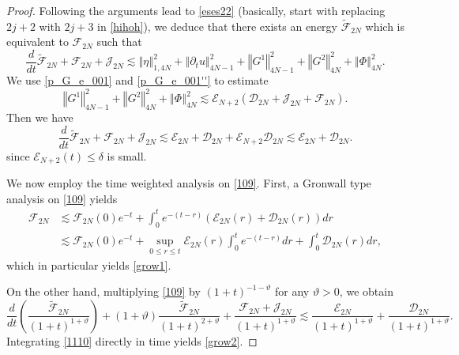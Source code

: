 \documentclass[a4paper,reqno,11pt]{amsart}
\numberwithin{equation}{section}
\providecommand{\norm}[1]{\left\Vert#1\right\Vert}
\providecommand{\sd}[1]{\mathcal{D}_{#1}}
\providecommand{\se}[1]{\mathcal{E}_{#1}}
\providecommand{\norm}[1]{\left\Vert#1\right\Vert}
\begin{document}
\begin{proof}
Following the arguments lead to \eqref{eses22} (basically, start with replacing $2j+2$ with $2j+3$ in \eqref{hihoh}), we deduce that there exists an energy $\tilde{\mathcal{F}}_{2N}$ which is equivalent to ${\mathcal{F}_{2N}}$ such that
\begin{equation}
 { \frac{d}{dt}}\tilde{\mathcal{F}}_{2N}
+  {\mathcal{F}_{2N}} +\mathcal{J}_{2N}  {\lesssim}  \norm{\eta}_{1,4N}^2+ \norm{{\partial}_t u}_{4N-1}^2
 + \norm{G^1}_{4N-1}^2+\norm{G^2}_{4N}^2+\norm{\Phi}_{4N}^2.
\end{equation}
We use \eqref{p_G_e_001} and \eqref{p_G_e_001''} to estimate
\begin{equation}
\norm{G^1}_{4N-1}^2+\norm{G^2}_{4N}^2+\norm{\Phi}_{4N}^2\lesssim  { \se{N+2}  }(\sd{2N} +  \mathcal{J}_{2N} +{\mathcal{F}_{2N}}).
\end{equation}
Then we have
\begin{equation}\label{109}
 { \frac{d}{dt}}\tilde{\mathcal{F}}_{2N}
+  {\mathcal{F}_{2N}} +\mathcal{J}_{2N}  {\lesssim}  \se{2N}+ \sd{2N}
 + { \se{N+2}  } \sd{2N}{\lesssim}  \se{2N}+ \sd{2N}.
\end{equation}
since $\se{N+2}(t) \le \delta$ is small.

We now employ the time weighted analysis on \eqref{109}. First, a Gronwall type analysis on \eqref{109} yields
\begin{equation}\label{1001}
\begin{split}
  {\mathcal{F}_{2N}}  & {\lesssim}  {\mathcal{F}_{2N}}(0) e^{-t}+\int_0^t e^{-(t-r)}\left(  \se{2N}(r)+ \sd{2N}(r) \right)dr
  \\& {\lesssim} {\mathcal{F}_{2N}}(0) e^{-t}+\sup_{0\le r\le t}\mathcal{E}_{2N}(r) \int_0^t e^{-(t-r)}dr+  \int_0^t \sd{2N}(r)  dr,
  \end{split}
\end{equation}
which in particular yields \eqref{grow1}.

On the other hand, multiplying \eqref{109} by $(1+t)^{-1-\vartheta}$ for any $\vartheta>0$, we obtain
\begin{equation}\label{1110}
 { \frac{d}{dt}} \left( \frac{\tilde{\mathcal{F}}_{2N}}{(1+t)^{1+\vartheta}}\right)+(1+\vartheta)\frac{\tilde{\mathcal{F}}_{2N}}{(1+t)^{2+\vartheta}}
+  \frac{{\mathcal{F}_{2N}}+\mathcal{J}_{2N}}{(1+t)^{1+\vartheta}} {\lesssim}   \frac{\se{2N}}{(1+t)^{1+\vartheta}}+  \frac{\sd{2N}}{(1+t)^{1+\vartheta}} .
\end{equation}
 Integrating \eqref{1110} directly in time yields \eqref{grow2}.
\end{proof}
\end{document}
